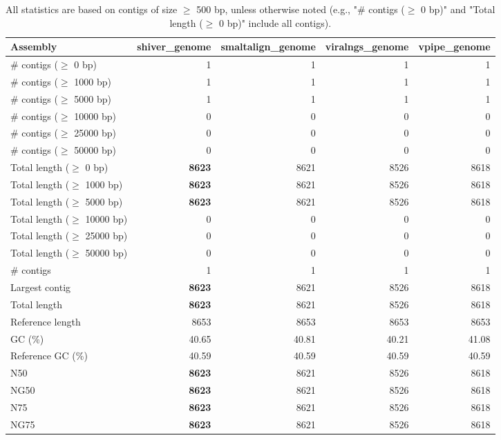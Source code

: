 \documentclass[12pt,a4paper]{article}
\begin{document}
\begin{table}[ht]
\begin{center}
\caption{All statistics are based on contigs of size $\geq$ 500 bp, unless otherwise noted (e.g., "\# contigs ($\geq$ 0 bp)" and "Total length ($\geq$ 0 bp)" include all contigs).}
\begin{tabular}{|l*{4}{|r}|}
\hline
Assembly & shiver\_genome & smaltalign\_genome & viralngs\_genome & vpipe\_genome \\ \hline
\# contigs ($\geq$ 0 bp) & 1 & 1 & 1 & 1 \\ \hline
\# contigs ($\geq$ 1000 bp) & 1 & 1 & 1 & 1 \\ \hline
\# contigs ($\geq$ 5000 bp) & 1 & 1 & 1 & 1 \\ \hline
\# contigs ($\geq$ 10000 bp) & 0 & 0 & 0 & 0 \\ \hline
\# contigs ($\geq$ 25000 bp) & 0 & 0 & 0 & 0 \\ \hline
\# contigs ($\geq$ 50000 bp) & 0 & 0 & 0 & 0 \\ \hline
Total length ($\geq$ 0 bp) & {\bf 8623} & 8621 & 8526 & 8618 \\ \hline
Total length ($\geq$ 1000 bp) & {\bf 8623} & 8621 & 8526 & 8618 \\ \hline
Total length ($\geq$ 5000 bp) & {\bf 8623} & 8621 & 8526 & 8618 \\ \hline
Total length ($\geq$ 10000 bp) & 0 & 0 & 0 & 0 \\ \hline
Total length ($\geq$ 25000 bp) & 0 & 0 & 0 & 0 \\ \hline
Total length ($\geq$ 50000 bp) & 0 & 0 & 0 & 0 \\ \hline
\# contigs & 1 & 1 & 1 & 1 \\ \hline
Largest contig & {\bf 8623} & 8621 & 8526 & 8618 \\ \hline
Total length & {\bf 8623} & 8621 & 8526 & 8618 \\ \hline
Reference length & 8653 & 8653 & 8653 & 8653 \\ \hline
GC (\%) & 40.65 & 40.81 & 40.21 & 41.08 \\ \hline
Reference GC (\%) & 40.59 & 40.59 & 40.59 & 40.59 \\ \hline
N50 & {\bf 8623} & 8621 & 8526 & 8618 \\ \hline
NG50 & {\bf 8623} & 8621 & 8526 & 8618 \\ \hline
N75 & {\bf 8623} & 8621 & 8526 & 8618 \\ \hline
NG75 & {\bf 8623} & 8621 & 8526 & 8618 \\ \hline

\end{tabular}
\end{center}
\end{table}
\end{document}
